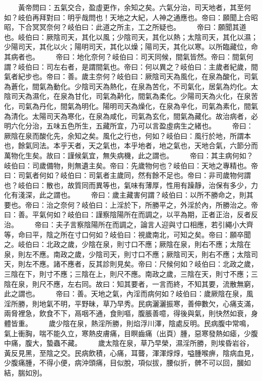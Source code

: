 　　黃帝問曰：五氣交合，盈虛更作，余知之矣。六氣分治，司天地者，其至何如？岐伯再拜對曰：明乎哉問也！天地之大紀，人神之通應也。帝曰：願聞上合昭昭，下合冥冥奈何？岐伯曰：此道之所主，工之所疑也。
　　帝曰：願聞其道也。岐伯曰：厥陰司天，其化以風；少陰司天，其化以熱；太陰司天，其化以濕；少陽司天，其化以火；陽明司天，其化以燥；陽司天，其化以寒。以所臨藏位，命其病者也。
　　帝曰：地化奈何？岐伯曰：司天同候，間氣皆然。帝曰：間氣何謂？岐伯曰：司左右者，是謂間氣也。帝曰：何以異之？岐伯曰：主歲者紀歲，間氣者紀步也。帝曰：善。歲主奈何？岐伯曰：厥陰司天為風化，在泉為酸化，司氣為蒼化，間氣為動化。少陰司天為熱化，在泉為苦化，不司氣化，居氣為灼化。太陰司天為濕化，在泉為甘化，司氣為黅化，間氣為柔化。少陽司天為火化，在泉苦化，司氣為丹化，間氣為明化。陽明司天為燥化，在泉為辛化，司氣為素化，間氣為清化。太陽司天為寒化，在泉為咸化，司氣為玄化，間氣為藏化。故治病者，必明六化分治，五味五色所生，五藏所宜，乃可以言盈虛病生之緒也。
　　帝曰：厥陰在泉而酸化先，余知之矣。風化之行也，何如？岐伯曰：風行於地，所謂本也，餘氣同法。本乎天者，天之氣也，本乎地者，地之氣也，天地合氣，六節分而萬物化生矣。故曰：謹候氣宜，無失病機，此之謂也。
　　帝曰：其主病何如？岐伯曰：司歲備物，則無遺主矣。帝曰：先歲物何也？岐伯曰：天地之專精也。帝曰：司氣者何如？岐伯曰：司氣者主歲同，然有餘不足也。帝曰：非司歲物何謂也？岐伯曰：散也，故質同而異等也，氣味有薄厚，性用有躁靜，治保有多少，力化有淺深，此之謂也。
　　帝曰：歲主藏害何謂？岐伯曰：以所不勝命之，則其要也。帝曰：治之奈何？岐伯曰：上淫於下，所勝平之，外淫於內，所勝治之。帝曰：善。平氣何如？岐伯曰：謹察陰陽所在而調之，以平為期，正者正治，反者反治。
　　帝曰：夫子言察陰陽所在而調之，論言人迎與寸口相應，若引繩小大齊等，命曰平，陰之所在寸口何如？岐伯曰：視歲南北，可知之矣。帝曰：願卒聞之。岐伯曰：北政之歲，少陰在泉，則寸口不應；厥陰在泉，則右不應；太陰在泉，則左不應。南政之歲，少陰司天，則寸口不應；厥陰司天，則右不應；太陰司天，則左不應。諸不應者，反其診則見矣。帝曰：尺候何如？岐伯曰：北政之歲，三陰在下，則寸不應；三陰在上，則尺不應。南政之歲，三陰在天，則寸不應；三陰在泉，則尺不應，左右同。故曰：知其要者，一言而終，不知其要，流散無窮，此之謂也。
　　帝曰：善。天地之氣，內淫而病何如？岐伯曰：歲厥陰在泉，風淫所勝，則地氣不明，平野昧，草乃早秀。民病灑灑振寒，善伸數欠，心痛支滿，兩脅裡急，飲食不下，鬲咽不通，食則嘔，腹脹善噫，得後與氣，則快然如衰，身體皆重。
　　歲少陰在泉，熱淫所勝，則焰浮川澤，陰處反明。民病腹中常鳴，氣上衝胸，喘不能久立，寒熱皮膚痛，目瞑齒痛（出頁）腫，惡寒發熱如瘧，少腹中痛，腹大，蟄蟲不藏。
　　歲太陰在泉，草乃早榮，濕淫所勝，則埃昏岩谷，黃反見黑，至陰之交。民病飲積，心痛，耳聾，渾渾焞焞，嗌腫喉痹，陰病血見，少腹痛腫，不得小便，病沖頭痛，目似脫，項似拔，腰似折，髀不可以回，膕如結，腨如別。
